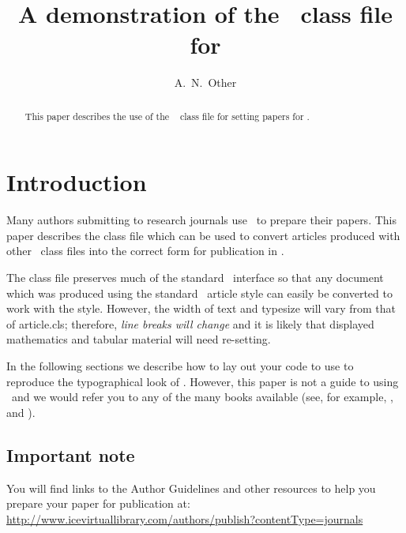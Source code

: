 \documentclass[times]{GeotechAuth}
\begin{document}

\title{A demonstration of the \LaTeXe\ class file for
\itshape{\journalname}}

\author{A.~N.~Other}

\address{Ice Publishing, One Great George Street, Westminster, London, SW1P 3AA, UK}

\begin{abstract}
This paper describes the use of the \LaTeXe\
\textsf{\journalclass} class file for setting papers for
\emph{\journalnamelc}.
\end{abstract}


\maketitle

\section{Introduction}
Many authors submitting to research journals use \LaTeXe\ to
prepare their papers. This paper describes the
\textsf{\journalclass} class file which can be used to convert
articles produced with other \LaTeXe\ class files into the correct
form for publication in \emph{\journalnamelc}.

The \textsf{\journalclass} class file preserves much of the
standard \LaTeXe\ interface so that any document which was
produced using the standard \LaTeXe\ \textsf{article} style can
easily be converted to work with the \textsf{\journalclassshort}
style. However, the width of text and typesize will vary from that
of \textsf{article.cls}; therefore, \emph{line breaks will change}
and it is likely that displayed mathematics and tabular material
will need re-setting.

In the following sections we describe how to lay out your code to
use \textsf{\journalclass} to reproduce the typographical look of
\emph{\journalnamelc}. However, this paper is not a guide to
using \LaTeXe\ and we would refer you to any of the many books
available (see, for example, \cite{R1}, \cite{R2} and \cite{R3}).

\subsection{Important note}
You will find links to the Author Guidelines and other resources to help you prepare your paper for publication at:\\
\url{http://www.icevirtuallibrary.com/authors/publish?contentType=journals}
\end{document}
